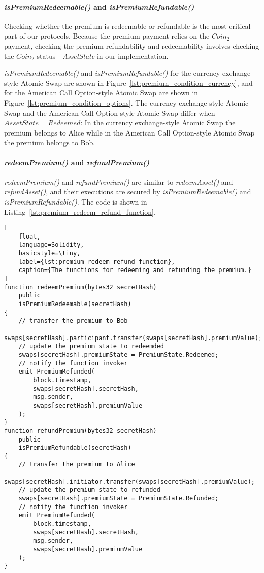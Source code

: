 \paragraph{\textit{isPremiumRedeemable()} and \textit{isPremiumRefundable()}}
Checking whether the premium is redeemable or refundable is the most critical part of our protocols.
Because the premium payment relies on the $Coin_2$ payment, checking the premium refundability and redeemability involves checking the $Coin_2$ status - \textit{AssetState} in our implementation.

\textit{isPremiumRedeemable()} and \textit{isPremiumRefundable()} for the currency exchange-style Atomic Swap are shown in Figure~\ref{lst:premium_condition_currency}, and for the American Call Option-style Atomic Swap are shown in Figure~\ref{lst:premium_condition_options}.
The currency exchange-style Atomic Swap and the American Call Option-style Atomic Swap differ when $AssetState = Redeemed$:
In the currency exchange-style Atomic Swap the premium belongs to Alice while in the American Call Option-style Atomic Swap the premium belongs to Bob.

\paragraph{\textit{redeemPremium()} and \textit{refundPremium()}}

\textit{redeemPremium()} and \textit{refundPremium()} are similar to \textit{redeemAsset()} and \textit{refundAsset()}, and their executions are secured by \textit{isPremiumRedeemable()} and \textit{isPremiumRefundable()}.
The code is shown in Listing~\ref{lst:premium_redeem_refund_function}.


\begin{lstlisting}[
    float,
    language=Solidity, 
    basicstyle=\tiny,
    label={lst:premium_redeem_refund_function},
    caption={The functions for redeeming and refunding the premium.}
]
function redeemPremium(bytes32 secretHash)
    public
    isPremiumRedeemable(secretHash)
{
    // transfer the premium to Bob
    swaps[secretHash].participant.transfer(swaps[secretHash].premiumValue);
    // update the premium state to redeemded
    swaps[secretHash].premiumState = PremiumState.Redeemed;
    // notify the function invoker
    emit PremiumRefunded(
        block.timestamp,
        swaps[secretHash].secretHash,
        msg.sender,
        swaps[secretHash].premiumValue
    );
}
function refundPremium(bytes32 secretHash)
    public
    isPremiumRefundable(secretHash)
{
    // transfer the premium to Alice
    swaps[secretHash].initiator.transfer(swaps[secretHash].premiumValue);
    // update the premium state to refunded
    swaps[secretHash].premiumState = PremiumState.Refunded;
    // notify the function invoker
    emit PremiumRefunded(
        block.timestamp,
        swaps[secretHash].secretHash,
        msg.sender,
        swaps[secretHash].premiumValue
    );
}
\end{lstlisting}


